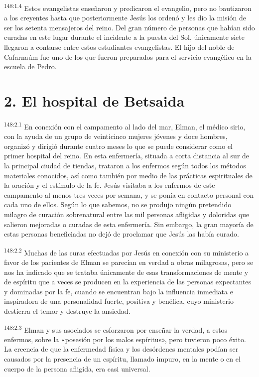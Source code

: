 \par
\textsuperscript{148:1.4} Estos evangelistas enseñaron y predicaron el evangelio, pero no bautizaron a los creyentes hasta que posteriormente Jesús los ordenó y les dio la misión de ser los setenta mensajeros del reino. Del gran número de personas que habían sido curadas en este lugar durante el incidente a la puesta del Sol, únicamente siete llegaron a contarse entre estos estudiantes evangelistas. El hijo del noble de Cafarnaúm fue uno de los que fueron preparados para el servicio evangélico en la escuela de Pedro.

\section*{2. El hospital de Betsaida}
\par
\textsuperscript{148:2.1} En conexión con el campamento al lado del mar, Elman, el médico sirio, con la ayuda de un grupo de veinticinco mujeres jóvenes y doce hombres, organizó y dirigió durante cuatro meses lo que se puede considerar como el primer hospital del reino. En esta enfermería, situada a corta distancia al sur de la principal ciudad de tiendas, trataron a los enfermos según todos los métodos materiales conocidos, así como también por medio de las prácticas espirituales de la oración y el estímulo de la fe. Jesús visitaba a los enfermos de este campamento al menos tres veces por semana, y se ponía en contacto personal con cada uno de ellos. Según lo que sabemos, no se produjo ningún pretendido milagro de curación sobrenatural entre las mil personas afligidas y doloridas que salieron mejoradas o curadas de esta enfermería. Sin embargo, la gran mayoría de estas personas beneficiadas no dejó de proclamar que Jesús las había curado.

\par
\textsuperscript{148:2.2} Muchas de las curas efectuadas por Jesús en conexión con su ministerio a favor de los pacientes de Elman se parecían en verdad a obras milagrosas, pero se nos ha indicado que se trataba únicamente de esas transformaciones de mente y de espíritu que a veces se producen en la experiencia de las personas expectantes y dominadas por la fe, cuando se encuentran bajo la influencia inmediata e inspiradora de una personalidad fuerte, positiva y benéfica, cuyo ministerio destierra el temor y destruye la ansiedad.

\par
\textsuperscript{148:2.3} Elman y sus asociados se esforzaron por enseñar la verdad, a estos enfermos, sobre la «posesión por los malos espíritus», pero tuvieron poco éxito. La creencia de que la enfermedad física y los desórdenes mentales podían ser causados por la presencia de un espíritu, llamado impuro, en la mente o en el cuerpo de la persona afligida, era casi universal.

